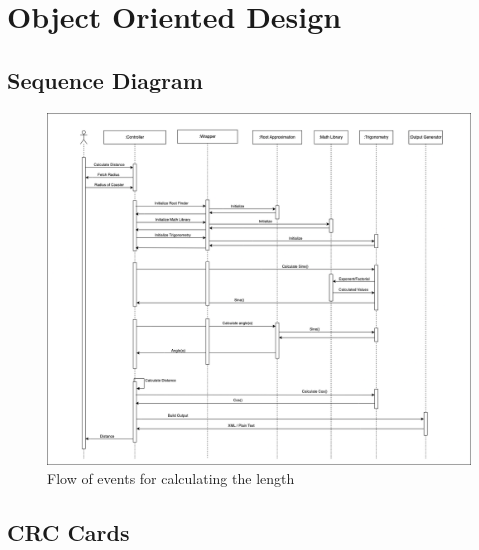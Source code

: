   \section{Object Oriented Design}
    \subsection{Sequence Diagram}
      \vspace{1cm}
      \begin{figure}[h!]
        \includegraphics[width=1\linewidth]{resources/cheers-sequence.png}
        \vspace{.5cm}
        \caption{Flow of events for calculating the length}
        \label{fig:Sequence Diagram}
      \end{figure}
      \pagebreak

  \subsection{CRC Cards}
